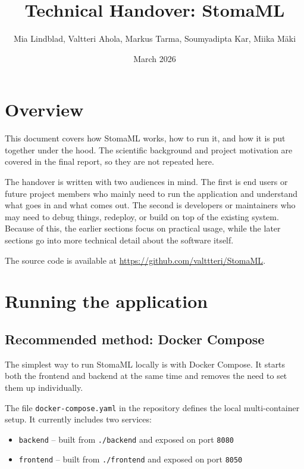 \documentclass{article}
\title{Technical Handover: StomaML}
\author{Mia Lindblad, Valtteri Ahola, Markus Tarma, Soumyadipta Kar, Miika Mäki}
\date{March 2026}
\begin{document}
\maketitle
\tableofcontents
\newpage

\section{Overview}

This document covers how StomaML works, how to run it, and how it is put together under the hood. The scientific background and project motivation are covered in the final report, so they are not repeated here.

The handover is written with two audiences in mind. The first is end users or future project members who mainly need to run the application and understand what goes in and what comes out. The second is developers or maintainers who may need to debug things, redeploy, or build on top of the existing system. Because of this, the earlier sections focus on practical usage, while the later sections go into more technical detail about the software itself.

The source code is available at \href{https://github.com/valttteri/StomaML}{https://github.com/valttteri/StomaML}.

\section{Running the application}

\subsection{Recommended method: Docker Compose}

The simplest way to run StomaML locally is with Docker Compose. It starts both the frontend and backend at the same time and removes the need to set them up individually.

The file \texttt{docker-compose.yaml} in the repository defines the local multi-container setup. It currently includes two services:

\begin{itemize}
    \item \texttt{backend} -- built from \texttt{./backend} and exposed on port \texttt{8080}
    \item \texttt{frontend} -- built from \texttt{./frontend} and exposed on port \texttt{8050}
\end{itemize}
\end{document}
